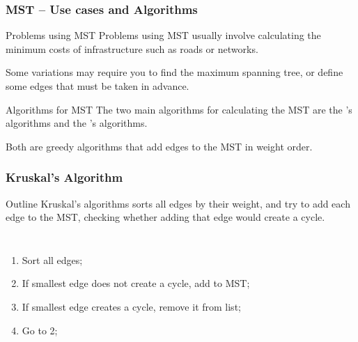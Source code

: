 \documentclass{beamer}
\begin{document}
\begin{frame}
  \frametitle{MST -- Use cases and Algorithms}
  {\small
  \begin{block}{Problems using MST}
    Problems using MST usually involve calculating the minimum costs
    of infrastructure such as roads or networks. 
    
    \medskip

    Some variations may require you to find the \alert{maximum}
    spanning tree, or define some edges that \alert{must} be taken in advance.
  \end{block}

  \begin{exampleblock}{Algorithms for MST}
    The two main algorithms for calculating the MST are the
    's algorithms and the 's
    algorithms.

    \medskip

    Both are greedy algorithms that add edges to the MST in weight order.
  \end{exampleblock}
    }
\end{frame}

\begin{frame}
  \frametitle{Kruskal's Algorithm}
  \begin{block}{Outline}
    Kruskal's algorithms sorts all edges by their weight, and try to
    add each edge to the MST, checking whether adding that edge would
    create a cycle.
  \end{block}

  \begin{columns}[T]
    \begin{enumerate}
    \item Sort all edges;
    \item If smallest edge does not create a cycle, add to MST;
    \item If smallest edge creates a cycle, remove it from list;
    \item Go to 2;
    \end{enumerate}
  \end{columns}
\end{frame}
\end{document}
